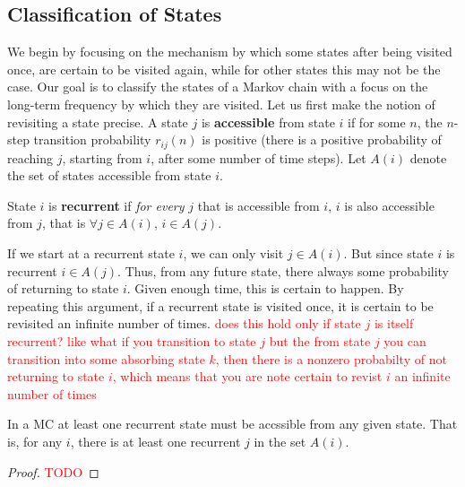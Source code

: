 \documentclass[11pt]{scrartcl}
\begin{document}
\subsection{Classification of States}
We begin by focusing on the mechanism by which some states after being visited
once, are certain to be visited again, while for other states this may not be
the case. Our goal is to classify the states of a Markov chain with a focus on
the long-term frequency by which they are visited. Let us first make the notion
of revisiting a state precise. A state $j$ is \textbf{accessible} from state $i$
if for some $n$, the $n$-step transition probability $r_{ij}(n)$ is positive
(there is a positive probability of reaching $j$, starting from $i$, after some
number of time steps). Let $A(i)$ denote the set of states accessible from
state $i$.
\begin{definition}[recurrent]
  State $i$ is \textbf{recurrent} if \emph{for every} $j$ that is accessible
from $i$, $i$ is also accessible from $j$, that is $\forall j \in A(i)$, $i\in
A(j)$. 
\end{definition}
If we start at a recurrent state $i$, we can only visit $j\in A(i)$. But since
state $i$ is recurrent $i\in A(j)$. Thus, from any future state, there always
some probability of returning to state $i$. Given enough time, this is certain
to happen. By repeating this argument, if a recurrent state is visited once, it
is certain to be revisited an infinite number of times. \textcolor{red}{does
this hold only if state $j$ is itself recurrent? like what if you transition to
state $j$ but the from state $j$ you can transition into some absorbing state
$k$, then there is a nonzero probabilty of not returning to state $i$, which
means that you are note certain to revist $i$ an infinite number of times}
\begin{example}
  In a MC at least one recurrent state must be accssible from any given state.
  That is, for any $i$, there is at least one recurrent $j$ in the set $A(i)$. 
  \begin{proof}
    \textcolor{red}{TODO} 
  \end{proof}
\end{example}
\end{document}
